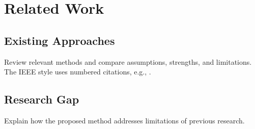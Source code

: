 \section{Related Work}\label{sec:related}
\subsection{Existing Approaches}
Review relevant methods and compare assumptions, strengths, and limitations.
The IEEE style uses numbered citations, e.g., \cite{shannon1948}.
\subsection{Research Gap}
Explain how the proposed method addresses limitations of previous research.
